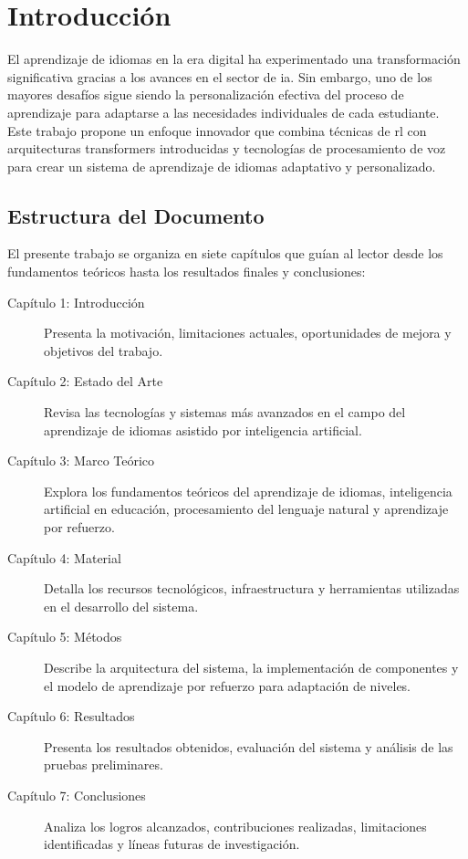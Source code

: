 \chapter{Introducción}
\label{chap:introduccion}

El aprendizaje de idiomas en la era digital ha experimentado una transformación significativa gracias a los avances en el sector de \gls{ia}. Sin embargo, uno de los mayores desafíos sigue siendo la personalización efectiva del proceso de aprendizaje para adaptarse a las necesidades individuales de cada estudiante. Este trabajo propone un enfoque innovador que combina técnicas de \gls{rl} con arquitecturas \gls{transformers} introducidas y tecnologías de procesamiento de voz para crear un sistema de aprendizaje de idiomas adaptativo y personalizado.

\section{Estructura del Documento}
\label{sec:estructura-documento}

El presente trabajo se organiza en siete capítulos que guían al lector desde los fundamentos teóricos hasta los resultados finales y conclusiones:

\begin{description}
  \item[Capítulo 1: Introducción] Presenta la motivación, limitaciones actuales, oportunidades de mejora y objetivos del trabajo.
  
  \item[Capítulo 2: Estado del Arte] Revisa las tecnologías y sistemas más avanzados en el campo del aprendizaje de idiomas asistido por inteligencia artificial.
  
  \item[Capítulo 3: Marco Teórico] Explora los fundamentos teóricos del aprendizaje de idiomas, inteligencia artificial en educación, procesamiento del lenguaje natural y aprendizaje por refuerzo.
  
  \item[Capítulo 4: Material] Detalla los recursos tecnológicos, infraestructura y herramientas utilizadas en el desarrollo del sistema.
  
  \item[Capítulo 5: Métodos] Describe la arquitectura del sistema, la implementación de componentes y el modelo de aprendizaje por refuerzo para adaptación de niveles.
  
  \item[Capítulo 6: Resultados] Presenta los resultados obtenidos, evaluación del sistema y análisis de las pruebas preliminares.
  
  \item[Capítulo 7: Conclusiones] Analiza los logros alcanzados, contribuciones realizadas, limitaciones identificadas y líneas futuras de investigación.
\end{description}

